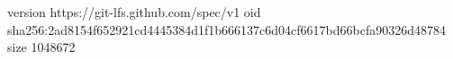 version https://git-lfs.github.com/spec/v1
oid sha256:2ad8154f652921cd4445384d1f1b666137c6d04cf6617bd66bcfa90326d48784
size 1048672
